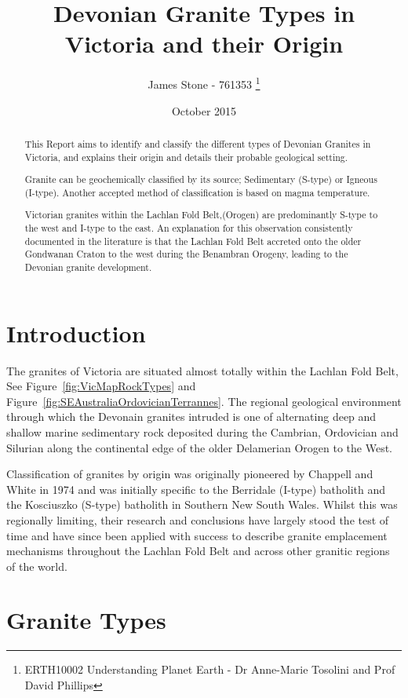 \documentclass[a4paper]{article}
\title{Devonian Granite Types in Victoria and their Origin}
\author{James Stone - 761353 \thanks{ERTH10002 Understanding Planet Earth -  Dr Anne-Marie Tosolini and Prof David Phillips}}
\date{October 2015}
\begin{document}
\maketitle
\newpage

\begin{abstract}
This Report aims to identify and classify the different types of Devonian Granites in Victoria, and explains their origin and details their probable geological setting.

Granite can be geochemically classified by its source; Sedimentary (S-type) or Igneous (I-type). Another accepted method of classification is based on magma temperature.

Victorian granites within the Lachlan Fold Belt,(Orogen) are predominantly S-type to the west and I-type to the east. An explanation for this observation consistently documented in the literature is that the Lachlan Fold Belt accreted onto the older Gondwanan Craton to the west during the Benambran Orogeny, leading to the Devonian granite development.
\end{abstract}

\section{Introduction}

The granites of Victoria are situated almost totally within the Lachlan Fold Belt, See Figure~\ref{fig:VicMapRockTypes} and Figure~\ref{fig:SEAustraliaOrdovicianTerrannes}. The regional geological environment through which the Devonain granites intruded is one of alternating deep and shallow marine sedimentary rock deposited during the Cambrian,  Ordovician and Silurian along the continental edge of the older Delamerian Orogen to the West. \cite{moorel1998palaeozoic}

Classification of granites by origin was originally pioneered by Chappell and White in 1974 and was initially specific to the Berridale (I-type) batholith and the Kosciuszko (S-type) batholith in Southern New South Wales. Whilst this was regionally limiting, their research and conclusions have largely stood the test of time and have since been applied with success to describe granite emplacement mechanisms throughout the Lachlan Fold Belt and across other granitic regions of the world.

\section{Granite Types}
\end{document}
